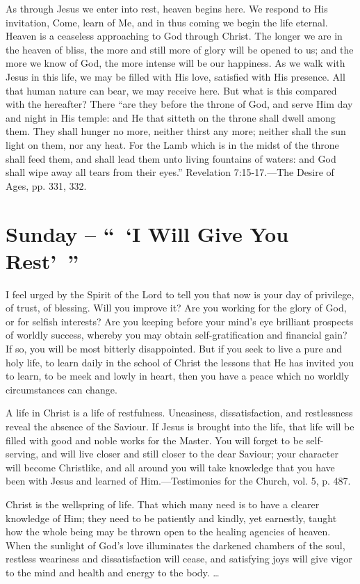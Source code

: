 \documentclass[a4paper, 10pt, twoside, headings=small]{scrartcl}
\begin{document}
\begin{multicols}{2}
As through Jesus we enter into rest, heaven begins here. We respond to His invitation, Come, learn of Me, and in thus coming we begin the life eternal. Heaven is a ceaseless approaching to God through Christ. The longer we are in the heaven of bliss, the more and still more of glory will be opened to us; and the more we know of God, the more intense will be our happiness. As we walk with Jesus in this life, we may be filled with His love, satisfied with His presence. All that human nature can bear, we may receive here. But what is this compared with the hereafter? There “are they before the throne of God, and serve Him day and night in His temple: and He that sitteth on the throne shall dwell among them. They shall hunger no more, neither thirst any more; neither shall the sun light on them, nor any heat. For the Lamb which is in the midst of the throne shall feed them, and shall lead them unto living fountains of waters: and God shall wipe away all tears from their eyes.” Revelation 7:15-17.—The Desire of Ages, pp. 331, 332.

\section*{Sunday – “ ‘I Will Give You Rest’ ”}

I feel urged by the Spirit of the Lord to tell you that now is your day of privilege, of trust, of blessing. Will you improve it? Are you working for the glory of God, or for selfish interests? Are you keeping before your mind’s eye brilliant prospects of worldly success, whereby you may obtain self-gratification and financial gain? If so, you will be most bitterly disappointed. But if you seek to live a pure and holy life, to learn daily in the school of Christ the lessons that He has invited you to learn, to be meek and lowly in heart, then you have a peace which no worldly circumstances can change.

A life in Christ is a life of restfulness. Uneasiness, dissatisfaction, and restlessness reveal the absence of the Saviour. If Jesus is brought into the life, that life will be filled with good and noble works for the Master. You will forget to be self-serving, and will live closer and still closer to the dear Saviour; your character will become Christlike, and all around you will take knowledge that you have been with Jesus and learned of Him.—Testimonies for the Church, vol. 5, p. 487.

Christ is the wellspring of life. That which many need is to have a clearer knowledge of Him; they need to be patiently and kindly, yet earnestly, taught how the whole being may be thrown open to the healing agencies of heaven. When the sunlight of God’s love illuminates the darkened chambers of the soul, restless weariness and dissatisfaction will cease, and satisfying joys will give vigor to the mind and health and energy to the body. …


\end{multicols}
\end{document}
